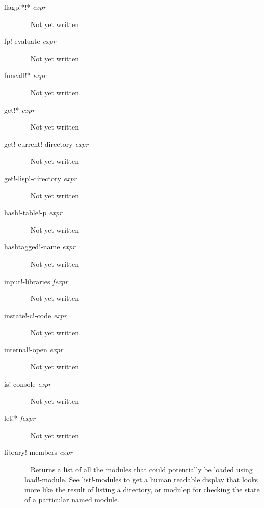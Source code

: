 \documentclass[a4paper,11pt]{article}
\begin{document}
\begin{description}
\item [{\ttfamily flagp!*!*} {\itshape  expr}] ~\newline
Not yet written

\item [{\ttfamily fp!-evaluate} {\itshape  expr}] ~\newline
Not yet written

\item [{\ttfamily funcall!*} {\itshape  expr}] ~\newline
Not yet written

\item [{\ttfamily get!*} {\itshape  expr}] ~\newline
Not yet written

\item [{\ttfamily get!-current!-directory} {\itshape  expr}] ~\newline
Not yet written

\item [{\ttfamily get!-lisp!-directory} {\itshape  expr}] ~\newline
Not yet written

\item [{\ttfamily hash!-table!-p} {\itshape  expr}] ~\newline
Not yet written

\item [{\ttfamily hashtagged!-name} {\itshape  expr}] ~\newline
Not yet written

\item [{\ttfamily input!-libraries} {\itshape  fexpr}] ~\newline
Not yet written

\item [{\ttfamily instate!-c!-code} {\itshape  expr}] ~\newline
Not yet written

\item [{\ttfamily internal!-open} {\itshape  expr}] ~\newline
Not yet written

\item [{\ttfamily is!-console} {\itshape  expr}] ~\newline
Not yet written

\item [{\ttfamily let!*} {\itshape  fexpr}] ~\newline
Not yet written

\item [{\ttfamily library!-members} {\itshape  expr}] ~\newline
Returns a list of all the modules that could potentially be loaded using
{\ttfamily load!-module}. See {\ttfamily list!-modules} to get a human
readable display that looks more like the result of listing a directory, or
{\ttfamily modulep} for checking the state of a particular named module.
  


\end{description}
\end{document}
